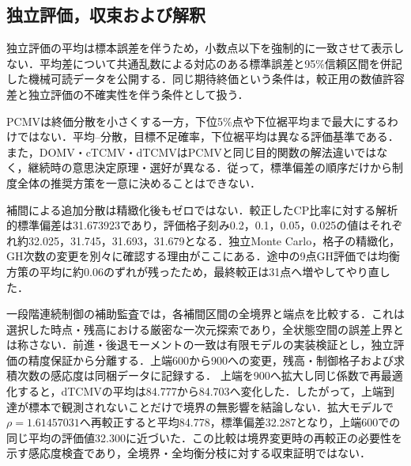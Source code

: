 \documentclass[10pt,a4paper]{article}
\numberwithin{equation}{section}
\numberwithin{table}{section}
\numberwithin{figure}{section}
\theoremstyle{plain}
\theoremstyle{definition}
\begin{document}
\subsection{独立評価，収束および解釈}
独立評価の平均は標本誤差を伴うため，小数点以下を強制的に一致させて表示しない．平均差について共通乱数による対応のある標準誤差と95\%信頼区間を併記した機械可読データを公開する．同じ期待終価という条件は，較正用の数値許容差と独立評価の不確実性を伴う条件として扱う．

PCMVは終価分散を小さくする一方，下位5\%点や下位裾平均まで最大にするわけではない．平均--分散，目標不足確率，下位裾平均は異なる評価基準である．また，DOMV・cTCMV・dTCMVはPCMVと同じ目的関数の解法違いではなく，継続時の意思決定原理・選好が異なる．従って，標準偏差の順序だけから制度全体の推奨方策を一意に決めることはできない．

補間による追加分散は精緻化後もゼロではない．較正したCP比率に対する解析的標準偏差は31.673923であり，評価格子刻み0.2，0.1，0.05，0.025の値はそれぞれ約32.025，31.745，31.693，31.679となる．独立Monte Carlo，格子の精緻化，GH次数の変更を別々に確認する理由がここにある．途中の9点GH評価では均衡方策の平均に約0.06のずれが残ったため，最終較正は31点へ増やしてやり直した．

一段階連続制御の補助監査では，各補間区間の全境界と端点を比較する．これは選択した時点・残高における厳密な一次元探索であり，全状態空間の誤差上界とは称さない．前進・後退モーメントの一致は有限モデルの実装検証とし，独立評価の精度保証から分離する．上端600から900への変更，残高・制御格子および求積次数の感応度は同梱データに記録する．
上端を900へ拡大し同じ係数で再最適化すると，dTCMVの平均は84.777から84.703へ変化した．したがって，上端到達が標本で観測されないことだけで境界の無影響を結論しない．拡大モデルで$\rho=1.61457031$へ再較正すると平均84.778，標準偏差32.287となり，上端600での同じ平均の評価値32.300に近づいた．この比較は境界変更時の再較正の必要性を示す感応度検査であり，全境界・全均衡分枝に対する収束証明ではない．
\end{document}
